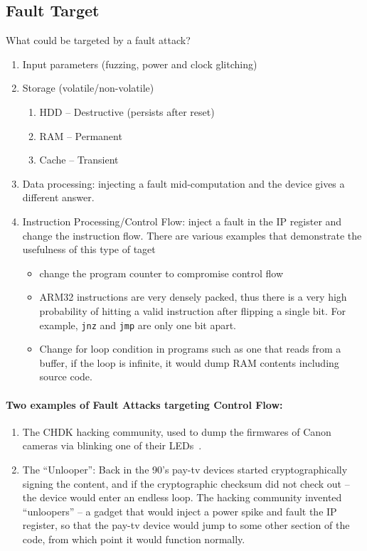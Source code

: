 \subsection{Fault Target}\label{subsec:fault_targets}
What could be targeted by a fault attack?
\begin{enumerate}
	\item Input parameters (fuzzing, power and clock glitching)
	\item Storage (volatile/non-volatile)
	\begin{enumerate}
		\item HDD -- Destructive (persists after reset)
		\item RAM -- Permanent
		\item Cache -- Transient
	\end{enumerate}
	\item Data processing: injecting a fault mid-computation and the device gives a
	different answer.
	\item Instruction Processing/Control Flow: inject a fault in the IP register
	and change the instruction flow. There are various examples that demonstrate
	the usefulness of this type of taget
	\begin{itemize}
		\item change the program counter to compromise control flow
		\item ARM32 instructions are very densely packed, thus there is a very
		high probability of hitting a valid instruction after flipping a single
		bit. For example, \texttt{jnz} and \texttt{jmp} are only one bit apart.
		\item Change for loop condition in programs such as one that
		reads from a buffer, if the loop is infinite, it would dump RAM contents
		including source code.
	\end{itemize}
\end{enumerate}

\paragraph{Two examples of Fault Attacks targeting Control Flow:}
\begin{enumerate}
	\item The CHDK hacking community, used to dump the firmwares of Canon
	cameras via blinking one of their LEDs~\cite{chdk, canon}.

	\item The ``Unlooper'': Back in the 90's pay-tv devices started
	cryptographically signing the content, and if the cryptographic checksum did
	not check out -- the device would enter an endless loop. The hacking
	community invented ``unloopers'' -- a gadget that would inject a power spike
	and fault the IP register, so that the pay-tv device would jump to some
	other section of the code, from which point it would function normally.
\end{enumerate}

